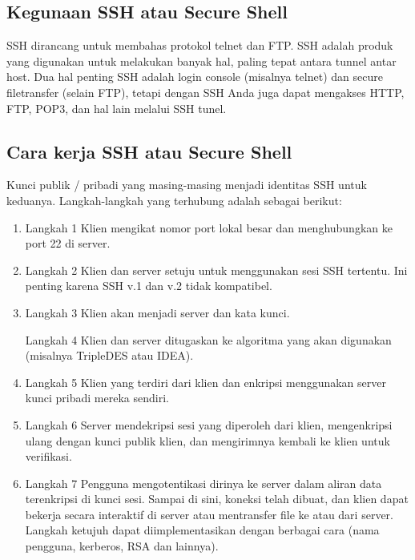 \subsection {Kegunaan SSH atau Secure Shell}
SSH dirancang untuk membahas protokol telnet dan FTP. SSH adalah produk yang digunakan untuk melakukan banyak hal, paling tepat antara tunnel antar host. Dua hal penting SSH adalah login console (misalnya telnet) dan secure filetransfer (selain FTP), tetapi dengan SSH Anda juga dapat mengakses HTTP, FTP, POP3, dan hal lain melalui SSH tunel.

\subsection {Cara kerja SSH atau Secure Shell}

Kunci publik / pribadi yang masing-masing menjadi identitas SSH untuk keduanya.
Langkah-langkah yang terhubung adalah sebagai berikut:

\begin{enumerate}

	\item Langkah 1 
	Klien mengikat nomor port lokal besar dan menghubungkan ke port 22 di server.

	\item Langkah 2
	Klien dan server setuju untuk menggunakan sesi SSH tertentu. Ini penting karena SSH v.1 dan v.2 tidak kompatibel.

	\item Langkah 3
	Klien akan menjadi server dan kata kunci.

	\ietm Langkah 4
	Klien dan server ditugaskan ke algoritma yang akan digunakan (misalnya TripleDES atau IDEA).

	\item Langkah 5
	Klien yang terdiri dari klien dan enkripsi menggunakan server kunci pribadi mereka sendiri.

	\item Langkah 6
	Server mendekripsi sesi yang diperoleh dari klien, mengenkripsi ulang dengan kunci publik klien, dan mengirimnya kembali ke klien untuk verifikasi.

	\item Langkah 7
	Pengguna mengotentikasi dirinya ke server dalam aliran data terenkripsi di kunci sesi. Sampai di sini, koneksi telah dibuat, dan klien dapat bekerja secara interaktif di server atau mentransfer file ke atau dari server. Langkah ketujuh dapat diimplementasikan dengan berbagai cara (nama pengguna, kerberos, RSA dan lainnya).

\end{enumerate}
	
